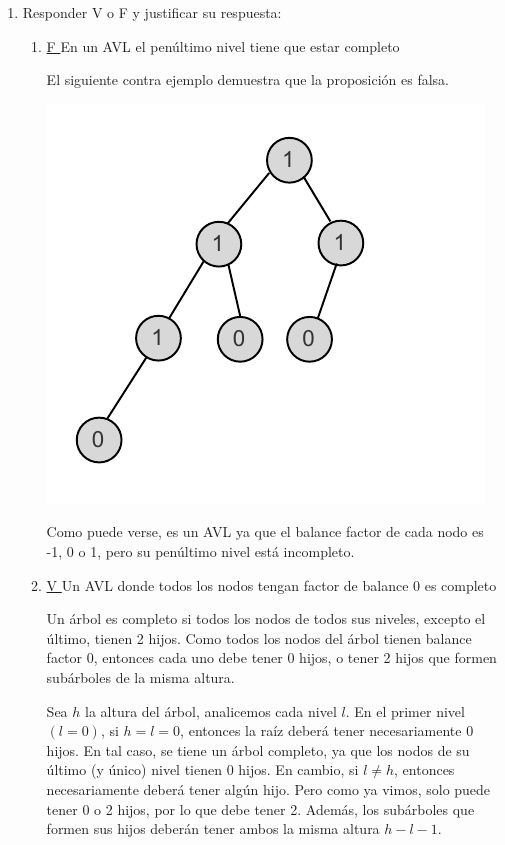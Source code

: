 \documentclass{article}
\begin{document}
\begin{enumerate}
\item Responder V o F y justificar su respuesta:
\begin{enumerate}
\item \underline{ F } En un AVL el penúltimo nivel tiene que estar completo

El siguiente contra ejemplo demuestra que la proposición es falsa.

\includegraphics[scale=0.5]{./img/ej6a-arbol.pdf}

Como puede verse, es un AVL ya que el balance factor de cada nodo es -1, 0 o 1, pero su penúltimo nivel está incompleto.

\item \underline{ V } Un AVL donde todos los nodos tengan factor de balance 0 es completo

Un árbol es completo si todos los nodos de todos sus niveles, excepto el último, tienen 2 hijos. Como todos los nodos del árbol tienen balance factor 0, entonces cada uno debe tener 0 hijos, o tener 2 hijos que formen subárboles de la misma altura.

Sea $h$ la altura del árbol, analicemos cada nivel $l$. En el primer nivel $(l=0)$, si $h=l=0$, entonces la raíz deberá tener necesariamente 0 hijos. En tal caso, se tiene un árbol completo, ya que los nodos de su último (y único) nivel tienen 0 hijos. En cambio, si $l\neq h$, entonces necesariamente deberá tener algún hijo. Pero como ya vimos, solo puede tener 0 o 2 hijos, por lo que debe tener 2. Además, los subárboles que formen sus hijos deberán tener ambos la misma altura $h-l-1$.


\end{enumerate}
\end{enumerate}
\end{document}
